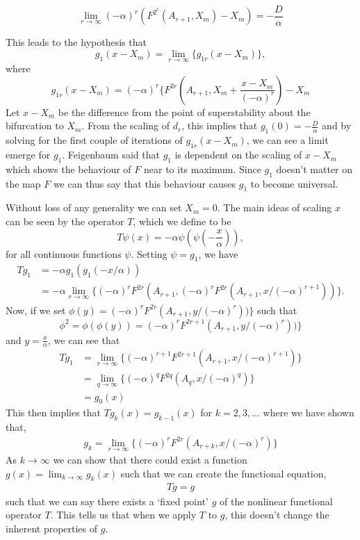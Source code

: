 \begin{equation}
\lim_{r \to \infty} (-\alpha)^r \left(F^{2^r}(A_{r+1}, X_m) - X_m\right) = - \frac{D}{\alpha}
\end{equation}

This leads to the hypothesis that
$$
g_1(x-X_m)=\lim_{r \to \infty} \{g_{1r}(x-X_m)\},
$$
where
$$
g_{1r}(x-X_m) = (-\alpha)^r \{F^{2r}(A_{r+1}, X_m + \frac{x-X_m}{(-\alpha)^r})-X_m
$$
Let $x-X_m$ be the difference from the point of superstability about the bifurcation to $X_m$. 
From the scaling of $d_r$, this implies that $g_1(0)=-\frac{D}{\alpha}$ and by solving for the first couple of iterations of $g_{1r}(x-X_m)$, we can see a limit emerge for $g_1$.
Feigenbaum said that $g_1$ is dependent on the scaling of $x-X_m$ which shows the behaviour of $F$ near to its maximum. 
Since $g_1$ doesn't matter on the map $F$ we can thus say that this behaviour causes $g_1$ to become universal.

Without loss of any generality we can set $X_m=0$.
The main ideas of scaling $x$ can be seen by the operator $T$, which we define to be
\begin{equation} \label{eq: operator T}
T\psi(x)=-\alpha \psi (\psi(-\frac{x}{\alpha})),
\end{equation}
for all continuous functions $\psi$.
Setting $\psi=g_1$, we have
\begin{align}
    Tg_1 &=-\alpha g_1(g_1(-x/\alpha)) \nonumber \\
    &= -\alpha \lim_{r \to \infty} \{(-\alpha)^rF^{2r}(A_{r+1}, (-\alpha)^rF^{2r}(A_{r+1},x/(-\alpha)^{r+1}))\}.  \label{eq:one}
\end{align}
Now, if we set $\phi(y)=(-\alpha)^rF^{2r}(A_{r+1},y/(-\alpha)^r))\}$ such that $$\phi^2=\phi(\phi(y))=(-\alpha)^rF^{2r+1}(A_{r+1},y/(-\alpha)^r))\}$$ and $y=\frac{x}{\alpha}$, we can see that
\begin{align*}
    Tg_1 &= \lim_{r \to \infty} \{(-\alpha)^{r+1}F^{2r+1}(A_{r+1}, x/(-\alpha)^{r+1})\} \\
    &= \lim_{q \to \infty} \{(-\alpha)^qF^{2q}(A_q,x/(-\alpha)^q)\} \\
    &= g_0(x)
\end{align*}
This then implies that $Tg_k(x)=g_{k-1}(x)$ for $k = 2,3,...$ where we have shown that,
\begin{align}
    g_k=\lim_{r \to \infty} \{(-\alpha)^{r}F^{2r}(A_{r+k}, x/(-\alpha)^{r})\} \label{eq:two}
\end{align} 
As $k \to \infty$ we can show that there could exist a function $g(x)= \lim_{k \to \infty}g_k(x)$ such that we can create the functional equation,
\begin{align}
    Tg=g \label{eq:FunctionalOperator}
\end{align}
such that we can say there exists a `fixed point' $g$ of the nonlinear functional operator $T$. This tells us that when we apply $T$ to $g$, this doesn't change the inherent properties of $g$. 

